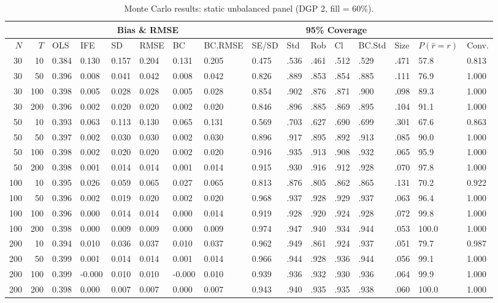 \begin{table}[ht]
\centering
\caption{Monte Carlo results: static unbalanced panel (DGP 2, fill = 60\%).} 
\label{tab:mc_static_unb_f60}
\begin{tabular}{rrllllllllllllll}
  \hline
 & & \multicolumn{6}{c}{Bias \& RMSE} & & \multicolumn{4}{c}{95\% Coverage} & & & \\
\cline{3-8}\cline{10-13}
 \hline
$N$ & $T$ & OLS & IFE & SD & RMSE & BC & BC.RMSE & SE/SD & Std & Rob & Cl & BC.Std & Size & $P(\hat r=r)$ & Conv. \\ 
  \hline
30 & 10 & 0.384 & 0.130 & 0.157 & 0.204 & 0.131 & 0.205 & 0.475 & .536 & .461 & .512 & .529 & .471 & 57.8 & 0.813 \\ 
  30 & 50 & 0.396 & 0.008 & 0.041 & 0.042 & 0.008 & 0.042 & 0.826 & .889 & .853 & .854 & .885 & .111 & 76.9 & 1.000 \\ 
  30 & 100 & 0.398 & 0.005 & 0.028 & 0.028 & 0.005 & 0.028 & 0.854 & .902 & .876 & .871 & .900 & .098 & 89.3 & 1.000 \\ 
  30 & 200 & 0.396 & 0.002 & 0.020 & 0.020 & 0.002 & 0.020 & 0.846 & .896 & .885 & .869 & .895 & .104 & 91.1 & 1.000 \\ 
  50 & 10 & 0.393 & 0.063 & 0.113 & 0.130 & 0.065 & 0.131 & 0.569 & .703 & .627 & .690 & .699 & .301 & 67.6 & 0.863 \\ 
  50 & 50 & 0.397 & 0.002 & 0.030 & 0.030 & 0.002 & 0.030 & 0.896 & .917 & .895 & .892 & .913 & .085 & 90.0 & 1.000 \\ 
  50 & 100 & 0.398 & 0.002 & 0.020 & 0.020 & 0.002 & 0.020 & 0.916 & .935 & .913 & .908 & .932 & .065 & 95.9 & 1.000 \\ 
  50 & 200 & 0.398 & 0.001 & 0.014 & 0.014 & 0.001 & 0.014 & 0.915 & .930 & .916 & .912 & .928 & .070 & 97.8 & 1.000 \\ 
  100 & 10 & 0.395 & 0.026 & 0.059 & 0.065 & 0.027 & 0.065 & 0.813 & .876 & .805 & .862 & .865 & .131 & 70.2 & 0.922 \\ 
  100 & 50 & 0.396 & 0.002 & 0.019 & 0.020 & 0.002 & 0.020 & 0.968 & .937 & .928 & .929 & .937 & .063 & 96.4 & 1.000 \\ 
  100 & 100 & 0.396 & 0.000 & 0.014 & 0.014 & 0.000 & 0.014 & 0.919 & .928 & .920 & .924 & .928 & .072 & 99.8 & 1.000 \\ 
  100 & 200 & 0.398 & 0.000 & 0.009 & 0.009 & 0.000 & 0.009 & 0.974 & .947 & .940 & .934 & .944 & .053 & 100.0 & 1.000 \\ 
  200 & 10 & 0.394 & 0.010 & 0.036 & 0.037 & 0.010 & 0.037 & 0.962 & .949 & .861 & .924 & .937 & .051 & 79.7 & 0.987 \\ 
  200 & 50 & 0.399 & 0.001 & 0.014 & 0.014 & 0.001 & 0.014 & 0.966 & .944 & .928 & .936 & .944 & .056 & 99.1 & 1.000 \\ 
  200 & 100 & 0.399 & -0.000 & 0.010 & 0.010 & -0.000 & 0.010 & 0.939 & .936 & .932 & .930 & .936 & .064 & 99.9 & 1.000 \\ 
  200 & 200 & 0.398 & 0.000 & 0.007 & 0.007 & 0.000 & 0.007 & 0.943 & .940 & .935 & .935 & .938 & .060 & 100.0 & 1.000 \\ 
   \hline
\end{tabular}
\end{table}
